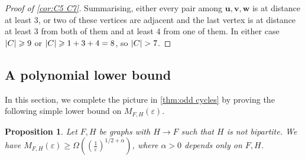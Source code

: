 \documentclass[reqno, english, 12pt]{amsart}
\theoremstyle{plain}
\newtheorem{proposition}[theorem]{Proposition}
\theoremstyle{remark}
\DeclarePairedDelimiter{\abs}{\lvert}{\rvert}
\renewcommand{\geq}{\geqslant}
\begin{document}
\begin{proof}[Proof of \cref{cor:C5 C7}]
	Summarising, either every pair among $\mathbf{u},\mathbf{v},\mathbf{w}$ is at distance at least $3$, or two of these vertices are adjacent and the last vertex is at distance at least $3$ from both of them and at least $4$ from one of them. In either case $\abs C \geq 9$ or $\abs C \geq 1+3+4 = 8$, so $\abs C > 7$.
	\end{proof}

\subsection{A polynomial lower bound}\label{sec:poly lower bound}
In this section, we complete the picture in \cref{thm:odd cycles} by proving the following simple lower bound on $M_{F,H}(\varepsilon)$.
\begin{proposition}\label{prop:poly LB}
	Let $F,H$ be graphs with $H \to F$ such that $H$ is not bipartite. We have $M_{F,H}(\varepsilon) \geq \Omega((\frac{1}{\varepsilon})^{1/2+\alpha})$, where $\alpha > 0$ depends only on $F,H$.
\end{proposition}
\end{document}

